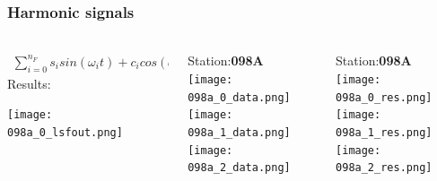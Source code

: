 \begin{frame}
  \frametitle{Harmonic signals}
  \framesubtitle{}
  \label{}
  \vskip-1cm
  \begin{columns}[T]
    \begin{column}{.33\textwidth}
      \begin{align*}
        \sum_{i=0}^{n_F} s_{i} sin(\omega_{i}t) + c_{i} cos(\omega_{i}t)
      \end{align*}
      Results:
       \begin{center}
         \texttt{[image: 098a\_0\_lsfout.png]}
       \end{center}
    \end{column}
    \begin{column}{.33\textwidth}
      \begin{center}
      Station:\textbf{098A}\\
         \texttt{[image: 098a\_0\_data.png]}\\
         \texttt{[image: 098a\_1\_data.png]}\\
         \texttt{[image: 098a\_2\_data.png]}
       \end{center} 
    \end{column}
    \begin{column}{.33\textwidth}
      \begin{center}
      Station:\textbf{098A}\\
         \texttt{[image: 098a\_0\_res.png]}\\
         \texttt{[image: 098a\_1\_res.png]}\\
         \texttt{[image: 098a\_2\_res.png]}
       \end{center} 
    \end{column}
  \end{columns}
\end{frame}
\note{}
%
